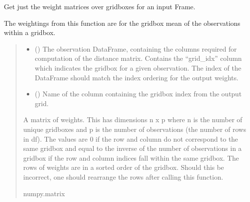 \documentclass[letterpaper,10pt,english]{sphinxmanual}
\begin{document}

\begin{fulllineitems}
\label{\detokenize{error_covariance:glomar_gridding.error_covariance.get_weights}}
\pysigstartsignatures
\pysiglinewithargsret
{}
{\sphinxparamcomma {}}
{}
\pysigstopsignatures
\sphinxAtStartPar
Get just the weight matrices over gridboxes for an input Frame.

\sphinxAtStartPar
The weightings from this function are for the gridbox mean of the
observations within a gridbox.
\begin{quote}\begin{description}
\begin{itemize}
\item {}
\sphinxAtStartPar
{} () \textendash{} The observation DataFrame, containing the columns required for
computation of the distance matrix. Contains the “grid\_idx” column which
indicates the gridbox for a given observation. The index of the
DataFrame should match the index ordering for the output weights.

\item {}
\sphinxAtStartPar
{} () \textendash{} Name of the column containing the gridbox index from the output grid.

\end{itemize}

\sphinxAtStartPar
{} \textendash{} A matrix of weights. This has dimensions n x p where n is the number of
unique gridboxes and p is the number of observations (the number of rows
in df). The values are 0 if the row and column do not correspond to the
same gridbox and equal to the inverse of the number of observations in a
gridbox if the row and column indices fall within the same gridbox. The
rows of weights are in a sorted order of the gridbox. Should this be
incorrect, one should re\sphinxhyphen{}arrange the rows after calling this function.

\sphinxAtStartPar
numpy.matrix

\end{description}\end{quote}

\end{fulllineitems}
\end{document}
